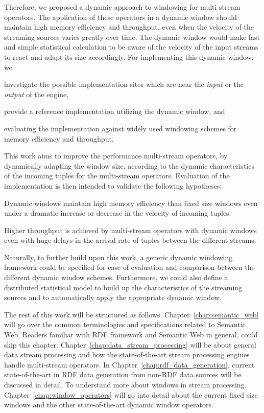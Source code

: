 Therefore, we proposed a dynamic approach to windowing for multi stream operators.
The application of these operators in a dynamic window should maintain high memory efficiency and throughput,
even when the velocity of the streaming sources varies greatly over time. 
The dynamic window would make fast and simple statistical calculation to be 
aware of the velocity of the input streams to react and adapt its size accordingly. 
For implementing this dynamic window, we 
\renewcommand{\labelenumi}{(\roman{enumi})}
\begin{enumerate*}
    \item investigate the possible implementation sites which are near the \emph{input}
    or the \emph{output} of the engine, 
    \item provide a reference implementation utilizing the dynamic window, and 
    \item evaluating the implementation against widely used windowing schemes for 
    memory efficiency and throughput. 
\end{enumerate*}


This work aims to improve the performance multi-stream operators, 
by dynamically adapting the window size, according to the dynamic characteristics
of the incoming tuples for the multi-stream operators. Evaluation of 
the implementation is then intended to validate the following hypotheses: 

\begin{hyp}
    Dynamic windows maintain high memory efficiency than 
    fixed size windows even under a dramatic increase or 
    decrease in the velocity of incoming tuples. 
\end{hyp}

\begin{hyp}
    Higher throughput is achieved by multi-stream operators 
    with dynamic windows even with huge delays in the arrival
    rate of tuples between the different streams.
\end{hyp}

Naturally, to further build upon this work, a generic dynamic windowing 
framework could be specified for ease of evaluation and comparison between 
the different dynamic window schemes. Furthermore, we could also define a distributed 
statistical model to build up the characteristics of the streaming sources 
and to automatically apply the appropriate dynamic window. 


The rest of this work will be structured as follows. Chapter~\ref{chap:semantic_web} will 
go over the common terminologies and specifications related to Semantic Web. Readers familiar
with RDF framework and Semantic Web in general, could skip this chapter. 
Chapter~\ref{chap:data_stream_processing} will be about general data stream processing 
and how the state-of-the-art stream processing engines handle multi-stream operators. 
In Chapter~\ref{chap:rdf_data_generation}, current state-of-the-art in 
RDF data generation from non-RDF data sources will be discussed in detail. 
To understand more about windows in stream processing, Chapter~\ref{chap:window_operators}
will go into detail about the current fixed size windows and the other state-of-the-art 
dynamic window operators. 